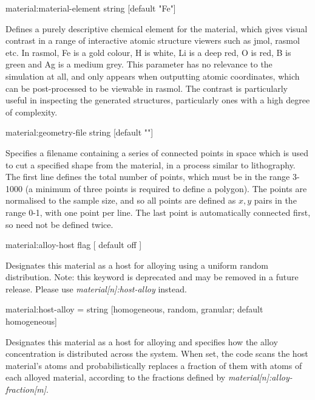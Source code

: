 {\zicf material:material-element string [default "Fe"]} Defines a purely descriptive chemical element for the material, which gives visual contrast in a range of interactive atomic structure viewers such as jmol, rasmol etc. In rasmol, Fe is a gold colour, H is white, Li is a deep red, O is red, B is green and Ag is a medium grey. This parameter has no relevance to the simulation at all, and only appears when outputting atomic coordinates, which can be post-processed to be viewable in rasmol. The contrast is particularly useful in inspecting the generated structures, particularly ones with a high degree of complexity.

{\zicf material:geometry-file string [default ""]} Specifies a filename containing a series of connected points in space which is used to cut a specified shape from the material, in a process similar to lithography. The first line defines the total number of points, which must be in the range 3-1000 (a minimum of three points is required to define a polygon). The points are normalised to the sample size, and so all points are defined as $x,y$ pairs in the range 0-1, with one point per line. The last point is automatically connected first, so need not be defined twice.

{\zicf material:alloy-host flag [ default off ]} Designates this material as a host for alloying using a uniform random distribution. Note: this keyword is deprecated and may be removed in a future release. Please use \textit{material[n]:host-alloy} instead.


{\zicf material:host-alloy = string [homogeneous, random, granular; default homogeneous]} Designates this material as a host for alloying and specifies how the alloy concentration is distributed across the system. When set, the code scans the host material's atoms and probabilistically replaces a fraction of them with atoms of each alloyed material, according to the fractions defined by \textit{material[n]:alloy-fraction[m]}.

